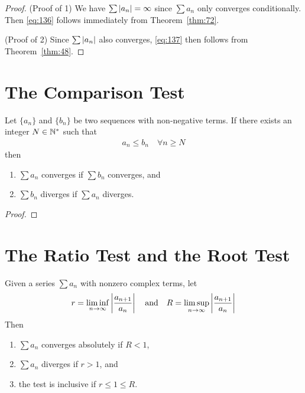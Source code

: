 \documentclass[thmcnt=section, 12pt]{my-elegantbook}
\begin{document}
\begin{proof}
    (Proof of 1)
    We have $\sum \left\lvert a_n \right\rvert = \infty$
    since $\sum a_n$ only converges conditionally.
    Then \eqref{eq:136} follows immediately
    from Theorem~\ref{thm:72}.

    (Proof of 2)
    Since $\sum \left\lvert a_n \right\rvert$ also converges,
    \eqref{eq:137} then follows from Theorem~\ref{thm:48}.
\end{proof}


\section{The Comparison Test}


\begin{theorem} \label{thm:52}
    Let $\{a_n\}$ and $\{b_n\}$ be two sequences with non-negative terms. If there exists an integer $N \in \mathbb{N}^\ast$ such that
    \begin{align*}
        a_n \leq b_n
        \quad \forall n \geq N
    \end{align*}
    then
    \begin{enumerate}
        \item $\sum a_n$ converges if $\sum b_n$ converges, and
        \item $\sum b_n$ diverges if $\sum a_n$ diverges.
    \end{enumerate}
\end{theorem}

\begin{proof}
\end{proof}


\section{The Ratio Test and the Root Test}


\begin{theorem} \label{thm:54}
    Given a series $\sum a_n$ with nonzero complex terms, let
    \begin{align*}
        r = \liminf_{n \to \infty} \left\lvert \frac{a_{n+1}}{a_n} \right\rvert
        \quad \text{and} \quad
        R = \limsup_{n \to \infty} \left\lvert \frac{a_{n+1}}{a_n} \right\rvert
    \end{align*}
    Then
    \begin{enumerate}
        \item $\sum a_n$ converges absolutely if $R < 1$,
        \item $\sum a_n$ diverges if $r > 1$, and
        \item the test is inclusive if $r \leq 1 \leq R$.
    \end{enumerate}
\end{theorem}
\end{document}
